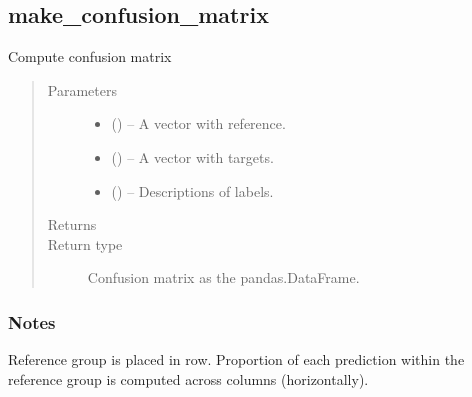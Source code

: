 \documentclass[a4paper,10pt,english]{sphinxmanual}
\begin{document}
\subsection{make\_confusion\_matrix}
\label{\detokenize{api/ucf.make_confusion_matrix:make-confusion-matrix}}\label{\detokenize{api/ucf.make_confusion_matrix::doc}}

\begin{fulllineitems}
\label{\detokenize{api/ucf.make_confusion_matrix:ucf.make_confusion_matrix}}
Compute confusion matrix
\begin{quote}\begin{description}
\item[{Parameters}] \leavevmode\begin{itemize}
\item {} 
 () -- A vector with reference.

\item {} 
 () -- A vector with targets.

\item {} 
 () -- Descriptions of labels.

\end{itemize}

\item[{Returns}] \leavevmode


\item[{Return type}] \leavevmode
Confusion matrix as the pandas.DataFrame.

\end{description}\end{quote}
\subsubsection*{Notes}

Reference group is placed in row. Proportion of each prediction
within the reference group is computed across columns (horizontally).

\end{fulllineitems}
\end{document}
